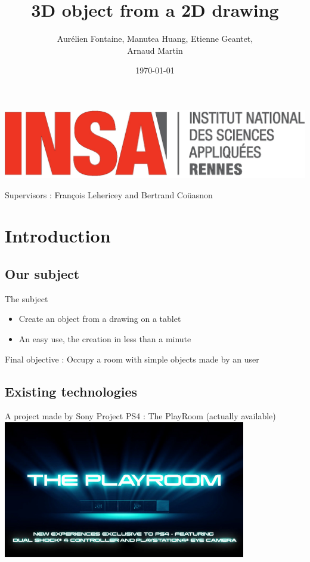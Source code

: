 \documentclass[a4paper,10pt]{beamer}
\title{3D object from a 2D drawing}
\author[Groupe 3INFO]{Aurélien Fontaine, Manutea Huang, Etienne Geantet,\\ Arnaud Martin}
\institute[INSA de Rennes]{Institut National des Sciences Appliquées de Rennes}
\date{\today}
\begin{document}
	\begin{frame}
		\begin{titlepage}
			\centerline{\includegraphics[scale=0.1]{images/logoINSA.jpg}}
			Supervisors : François Lehericey and Bertrand Coüasnon	
		\end{titlepage}
	\end{frame}
	
	\begin{frame}
		\tableofcontents
	\end{frame}
	
	\section{Introduction}
	
		\subsection{Our subject}
	
			\begin{frame}{The subject}
				\begin{itemize}
					\item Create an object from a drawing on a tablet
					\item An easy use, the creation in less than a minute
				\end{itemize}
				Final objective : Occupy a room with simple objects made by an user
			\end{frame}
			
		\subsection{Existing technologies}
			
			\begin{frame}{A project made by Sony}
				Project PS4 : The PlayRoom (actually available)
				\href{run:The_PlayRoom.avi}{\includegraphics[width=300pt]{images/The-Playroom.jpg}}
			\end{frame}
			
\end{document}
